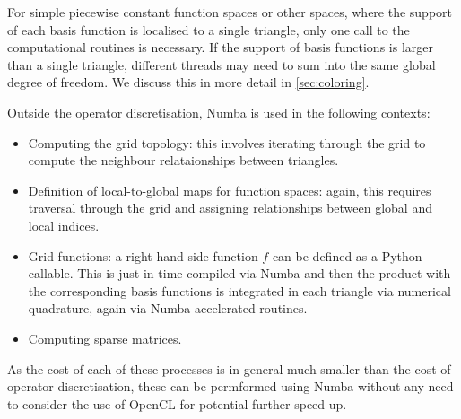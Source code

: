 For simple piecewise constant function spaces or other spaces, where the support of each basis function is localised to a single triangle, only one call to the computational routines is necessary. If the support of basis functions is larger than a single triangle, different threads may need to sum into the same global degree of freedom. We discuss this in more detail in \cref{sec:coloring}.

Outside the operator discretisation, Numba is used in the following contexts:
\begin{itemize}
  \item Computing the grid topology: this involves iterating through the grid to compute the neighbour relataionships between triangles.
  \item Definition of local-to-global maps for function spaces: again, this requires traversal through the grid and assigning relationships between global and local indices.
  \item Grid functions: a right-hand side function $f$ can be defined as a Python callable. This is just-in-time compiled via Numba and then the product with the corresponding basis functions is integrated in each triangle via numerical quadrature, again via Numba accelerated routines.
  \item Computing sparse matrices.
\end{itemize}

As the cost of each of these processes is in general much smaller than the cost of operator discretisation, these can be permformed using Numba without any need to consider the use of OpenCL for potential further speed up.

